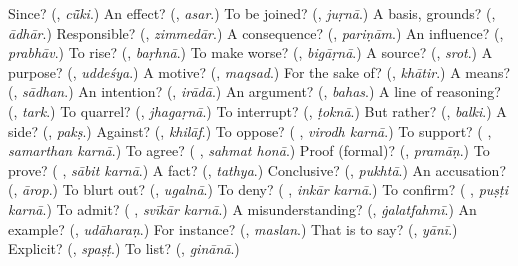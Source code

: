 \begin{tcolorbox}[breakable,colback=teal!4,colframe=teal!35!black,title={Before you move on}]
Since? (\textbf{}, \emph{cū̃ki}.) An effect? (\textbf{}, \emph{asar}.) To be joined? (\textbf{}, \emph{juṛnā}.) A basis, grounds? (\textbf{}, \emph{ādhār}.) Responsible? (\textbf{}, \emph{zimmedār}.) A consequence? (\textbf{}, \emph{pariṇām}.) An influence? (\textbf{}, \emph{prabhāv}.) To rise? (\textbf{}, \emph{baṛhnā}.) To make worse? (\textbf{}, \emph{bigāṛnā}.) A source? (\textbf{}, \emph{srot}.) A purpose? (\textbf{}, \emph{uddeśya}.) A motive? (\textbf{}, \emph{maqsad}.) For the sake of? (\textbf{}, \emph{khātir}.) A means? (\textbf{}, \emph{sādhan}.) An intention? (\textbf{}, \emph{irādā}.) An argument? (\textbf{}, \emph{bahas}.) A line of reasoning? (\textbf{}, \emph{tark}.) To quarrel? (\textbf{}, \emph{jhagaṛnā}.) To interrupt? (\textbf{}, \emph{ṭoknā}.) But rather? (\textbf{}, \emph{balki}.) A side? (\textbf{}, \emph{pakṣ}.) Against? (\textbf{}, \emph{khilāf}.) To oppose? (\textbf{ }, \emph{virodh karnā}.) To support? (\textbf{ }, \emph{samarthan karnā}.) To agree? (\textbf{ }, \emph{sahmat honā}.) Proof (formal)? (\textbf{}, \emph{pramāṇ}.) To prove? (\textbf{ }, \emph{sābit karnā}.) A fact? (\textbf{}, \emph{tathya}.) Conclusive? (\textbf{}, \emph{pukhtā}.) An accusation? (\textbf{}, \emph{ārop}.) To blurt out? (\textbf{}, \emph{ugalnā}.) To deny? (\textbf{ }, \emph{inkār karnā}.) To confirm? (\textbf{ }, \emph{puṣṭi karnā}.) To admit? (\textbf{ }, \emph{svīkār karnā}.) A misunderstanding? (\textbf{}, \emph{ġalatfahmī}.) An example? (\textbf{}, \emph{udāharaṇ}.) For instance? (\textbf{}, \emph{maslan}.) That is to say? (\textbf{}, \emph{yānī}.) Explicit? (\textbf{}, \emph{spaṣṭ}.) To list? (\textbf{}, \emph{ginānā}.)
\end{tcolorbox}
